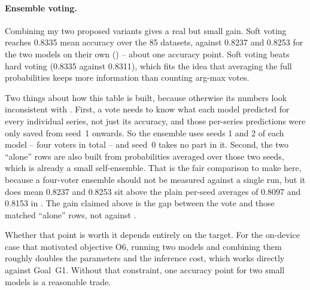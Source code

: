 \paragraph{Ensemble voting.}
Combining my two proposed variants gives a real but small gain. Soft voting reaches 0.8335 mean
accuracy over the 85 \ucr{} datasets, against 0.8237 and 0.8253 for the two models on their own
() -- about one accuracy point. Soft voting beats hard voting (0.8335 against
0.8311), which fits the idea that averaging the full probabilities keeps more information than
counting arg-max votes.

Two things about how this table is built, because otherwise its numbers look inconsistent with
. First, a vote needs to know what each model predicted for every individual
series, not just its accuracy, and those per-series predictions were only saved from seed~1 onwards.
So the ensemble uses seeds 1 and 2 of each model -- four voters in total -- and seed~0 takes no part
in it. Second, the two ``alone'' rows are also built from probabilities averaged over those two
seeds, which is already a small self-ensemble. That is the fair comparison to make here, because a
four-voter ensemble should not be measured against a single run, but it does mean 0.8237 and 0.8253
sit above the plain per-seed averages of 0.8097 and 0.8153 in . The gain
claimed above is the gap between the vote and those matched ``alone'' rows, not against
.

Whether that point is worth it depends entirely on the target. For the on-device case that
motivated objective O6, running two models and combining them roughly doubles the parameters and
the inference cost, which works directly against Goal~G1. Without that constraint, one accuracy
point for two small models is a reasonable trade.

